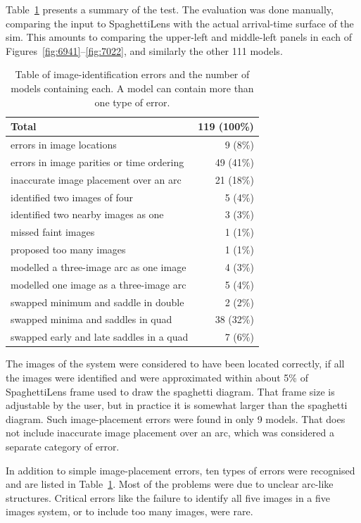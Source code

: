 \documentclass[usenatbib]{mn2e}
\newcommand{\spl}{SpaghettiLens\xspace}
\newcommand{\tabref}[1]{Table~\ref{tab:#1}}
\begin{document}
\tabref{stats} presents a summary of the test.  The evaluation was
done manually, comparing the input to \spl with the actual
arrival-time surface of the sim.  This amounts to comparing the
upper-left and middle-left panels in each of
Figures~\ref{fig:6941}--\ref{fig:7022}, and similarly the other 111
models.

\begin{table}\centering\begin{tabular}{lr}\hline
    Total & 119 (100\%)\\
\hline
    errors in image locations  & 9 (8\%)\\
    errors in image parities or time ordering & 49 (41\%) \\
\hline
    inaccurate image placement over an arc & 21 (18\%) \\
    identified two images of four & 5 (4\%) \\
    identified two nearby images as one & 3 (3\%) \\
    missed faint images & 1 (1\%) \\
    proposed too many images & 1 (1\%) \\
    modelled a three-image arc as one image & 4 (3\%) \\
    modelled one image as a three-image arc & 5 (4\%) \\
    swapped minimum and saddle in double  & 2 (2\%) \\
    swapped minima and saddles in quad & 38 (32\%)\\
    swapped early and late saddles in a quad & 7 (6\%) \\
\hline
\end{tabular}
\caption{Table of image-identification errors and the number of models
  containing each.  A model can contain more than one type of error.}
\label{tab:stats}
\end{table}

The images of the system were considered to have been located
correctly, if all the images were identified and were approximated
within about 5\% of \spl frame used to draw the spaghetti diagram.
That frame size is adjustable by the user, but in practice it is
somewhat larger than the spaghetti diagram.  Such image-placement
errors were found in only 9 models.  That does not include inaccurate
image placement over an arc, which was considered a separate category
of error.

In addition to simple image-placement errors, ten types of errors were
recognised and are listed in \tabref{stats}.  Most of the problems
were due to unclear arc-like structures.  Critical errors like the
failure to identify all five images in a five images system, or to
include too many images, were rare.
\end{document}
